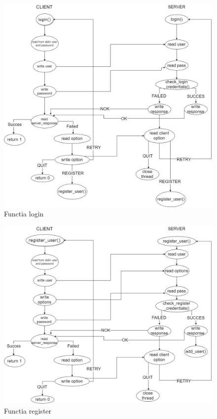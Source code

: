\documentclass[runningheads]{llncs}
\begin{document}
\begin{figure}[H]
\includegraphics[width=\textwidth]{login.jpg}
\caption{Functia login}
\end{figure}

\begin{figure}[H]
\includegraphics[width=\textwidth]{register.jpg}
\caption{Functia register}
\end{figure}
\end{document}
